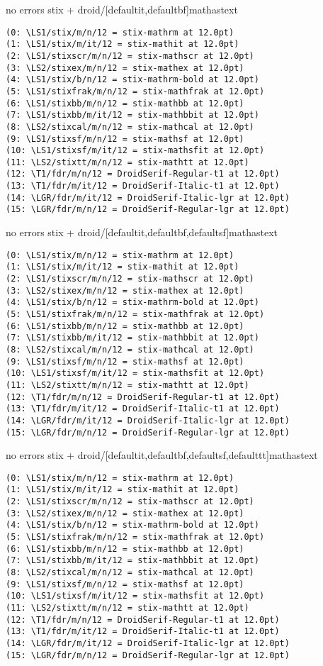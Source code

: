 \documentclass[12pt]{article}
\begin{document}
no errors
stix + droid/[defaultit,defaultbf]mathastext
\begin{lstlisting}
(0: \LS1/stix/m/n/12 = stix-mathrm at 12.0pt)
(1: \LS1/stix/m/it/12 = stix-mathit at 12.0pt)
(2: \LS1/stixscr/m/n/12 = stix-mathscr at 12.0pt)
(3: \LS2/stixex/m/n/12 = stix-mathex at 12.0pt)
(4: \LS1/stix/b/n/12 = stix-mathrm-bold at 12.0pt)
(5: \LS1/stixfrak/m/n/12 = stix-mathfrak at 12.0pt)
(6: \LS1/stixbb/m/n/12 = stix-mathbb at 12.0pt)
(7: \LS1/stixbb/m/it/12 = stix-mathbbit at 12.0pt)
(8: \LS2/stixcal/m/n/12 = stix-mathcal at 12.0pt)
(9: \LS1/stixsf/m/n/12 = stix-mathsf at 12.0pt)
(10: \LS1/stixsf/m/it/12 = stix-mathsfit at 12.0pt)
(11: \LS2/stixtt/m/n/12 = stix-mathtt at 12.0pt)
(12: \T1/fdr/m/n/12 = DroidSerif-Regular-t1 at 12.0pt)
(13: \T1/fdr/m/it/12 = DroidSerif-Italic-t1 at 12.0pt)
(14: \LGR/fdr/m/it/12 = DroidSerif-Italic-lgr at 12.0pt)
(15: \LGR/fdr/m/n/12 = DroidSerif-Regular-lgr at 12.0pt)  
\end{lstlisting}

no errors
stix + droid/[defaultit,defaultbf,defaultsf]mathastext
\begin{lstlisting}
(0: \LS1/stix/m/n/12 = stix-mathrm at 12.0pt)
(1: \LS1/stix/m/it/12 = stix-mathit at 12.0pt)
(2: \LS1/stixscr/m/n/12 = stix-mathscr at 12.0pt)
(3: \LS2/stixex/m/n/12 = stix-mathex at 12.0pt)
(4: \LS1/stix/b/n/12 = stix-mathrm-bold at 12.0pt)
(5: \LS1/stixfrak/m/n/12 = stix-mathfrak at 12.0pt)
(6: \LS1/stixbb/m/n/12 = stix-mathbb at 12.0pt)
(7: \LS1/stixbb/m/it/12 = stix-mathbbit at 12.0pt)
(8: \LS2/stixcal/m/n/12 = stix-mathcal at 12.0pt)
(9: \LS1/stixsf/m/n/12 = stix-mathsf at 12.0pt)
(10: \LS1/stixsf/m/it/12 = stix-mathsfit at 12.0pt)
(11: \LS2/stixtt/m/n/12 = stix-mathtt at 12.0pt)
(12: \T1/fdr/m/n/12 = DroidSerif-Regular-t1 at 12.0pt)
(13: \T1/fdr/m/it/12 = DroidSerif-Italic-t1 at 12.0pt)
(14: \LGR/fdr/m/it/12 = DroidSerif-Italic-lgr at 12.0pt)
(15: \LGR/fdr/m/n/12 = DroidSerif-Regular-lgr at 12.0pt)  
\end{lstlisting}

no errors
stix + droid/[defaultit,defaultbf,defaultsf,defaulttt]mathastext
\begin{lstlisting}
(0: \LS1/stix/m/n/12 = stix-mathrm at 12.0pt)
(1: \LS1/stix/m/it/12 = stix-mathit at 12.0pt)
(2: \LS1/stixscr/m/n/12 = stix-mathscr at 12.0pt)
(3: \LS2/stixex/m/n/12 = stix-mathex at 12.0pt)
(4: \LS1/stix/b/n/12 = stix-mathrm-bold at 12.0pt)
(5: \LS1/stixfrak/m/n/12 = stix-mathfrak at 12.0pt)
(6: \LS1/stixbb/m/n/12 = stix-mathbb at 12.0pt)
(7: \LS1/stixbb/m/it/12 = stix-mathbbit at 12.0pt)
(8: \LS2/stixcal/m/n/12 = stix-mathcal at 12.0pt)
(9: \LS1/stixsf/m/n/12 = stix-mathsf at 12.0pt)
(10: \LS1/stixsf/m/it/12 = stix-mathsfit at 12.0pt)
(11: \LS2/stixtt/m/n/12 = stix-mathtt at 12.0pt)
(12: \T1/fdr/m/n/12 = DroidSerif-Regular-t1 at 12.0pt)
(13: \T1/fdr/m/it/12 = DroidSerif-Italic-t1 at 12.0pt)
(14: \LGR/fdr/m/it/12 = DroidSerif-Italic-lgr at 12.0pt)
(15: \LGR/fdr/m/n/12 = DroidSerif-Regular-lgr at 12.0pt)  
\end{lstlisting}
\end{document}
